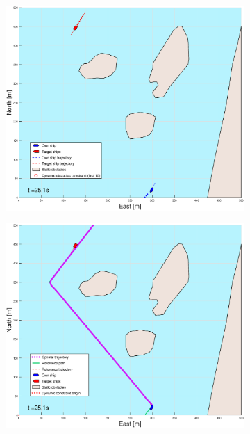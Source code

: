 \begin{figure}[!b]
\begin{subfigure}[b]{0.499\textwidth}
    \end{subfigure}
    \hfill
    \\
    \begin{subfigure}[b]{0.49\textwidth}
        \centering
        \includegraphics[width=\textwidth]{Images/Figures/Helloya/_Simple_0fig1_time=25}
    \end{subfigure}
    \hfill
    \begin{subfigure}[b]{0.499\textwidth}
        \centering
        \includegraphics[width=\textwidth]{Images/Figures/Helloya/_Simple_0fig999_time=25}

\end{subfigure}
\end{figure}
